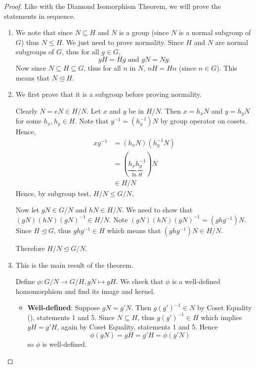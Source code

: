 \begin{proof}
    Like with the Diamond Isomorphism Theorem, we will prove the statements in sequence.

    \begin{enumerate}
        \item We note that since $N \subseteq H$ and $N$ is a group (since $N$ is a normal subgroup of $G$) thus $N \leq H$. We just need to prove normality. Since $H$ and $N$ are normal subgroups of $G$, thus for all $g \in G$,
        \[
            gH = Hg \text{ and } gN = Ng.
        \]
        Now since $N \subseteq H \subseteq G$, thus for all $n$ in $N$, $nH = Hn$ (since $n \in G$). This means that $N \unlhd H$.

        \item We first prove that it is a subgroup before proving normality.

        Clearly $N = eN \in H/N$. Let $x$ and $y$ be in $H/N$. Then $x=h_xN$ and $y=h_yN$ for some $h_x, h_y \in H$. Note that $y^{-1} = (h_y^{-1})N$ by group operator on cosets. Hence,
        \begin{align*}
            xy^{-1} &= (h_xN)(h_y^{-1}N)\\
            &= (\underbrace{h_xh_y^{-1}}_{\text{In }H})N\\
            &\in H/N
        \end{align*}
        Hence, by subgroup test, $H/N \leq G/N$.

        Now let $gN \in G/N$ and $hN \in H/N$. We need to show that $(gN)(hN)(gN)^{-1} \in H/N$. Note $(gN)(hN)(gN)^{-1} = (ghg^{-1})N$. Since $H \unlhd G$, thus $ghg^{-1} \in H$ which means that $(ghg^{-1})N \in H/N$.

        Therefore $H/N \unlhd G/N$.

        \item This is the main result of the theorem.

        Define $\phi: G/N \to G/H, gN \mapsto gH$. We check that $\phi$ is a well-defined homomorphism and find its image and kernel.
        \begin{itemize}
            \item \textbf{Well-defined}: Suppose $gN = g'N$. Then $g(g')^{-1} \in N$ by Coset Equality (), statements 1 and 5. Since $N \subseteq H$, thus $g(g')^{-1} \in H$ which implies $gH = g'H$, again by Coset Equality, statements 1 and 5. Hence
            \[
                \phi(gN) = gH = g'H = \phi(g'N)
            \]
            so $\phi$ is well-defined.


\end{itemize}
\end{enumerate}
\end{proof}
